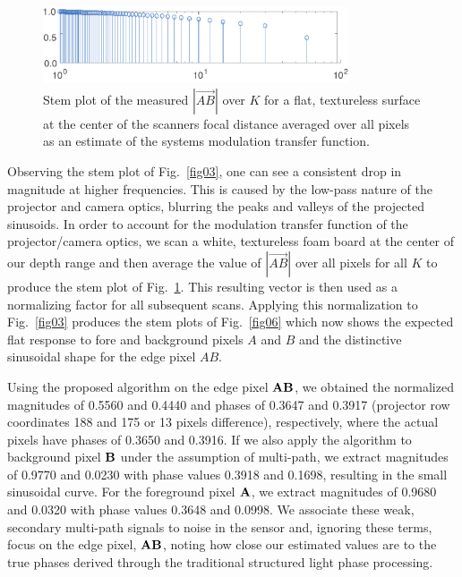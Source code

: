 \documentclass[10pt]{article}
\begin{document}
\begin{figure}[!b]
\centering\includegraphics[width=3.55in]{Figures/figure04}
\caption{Stem plot of the measured $|\vec{AB}|$ over $K$ for a flat, textureless surface at the center of the scanners focal distance averaged over all pixels as an estimate of the systems modulation transfer function.}
\label{fig04}
\end{figure}

Observing the stem plot of Fig.~\ref{fig03}, one can see a consistent drop in magnitude at higher frequencies.  This is caused by the low-pass nature of the projector and camera optics, blurring the peaks and valleys of the projected sinusoids.  In order to account for the modulation transfer function of the projector/camera optics, we scan a white, textureless foam board at the center of our depth range and then average the value of $|\vec{AB}|$ over all pixels for all $K$ to produce the stem plot of Fig.~\ref{fig04}.  This resulting vector is then used as a normalizing factor for all subsequent scans. Applying this normalization to Fig.~\ref{fig03} produces the stem plots of Fig.~\ref{fig06} which now shows the expected flat response to fore and background pixels $A$ and $B$ and the distinctive sinusoidal shape for the edge pixel $AB$. 

Using the proposed algorithm on the edge pixel ${\bf AB}$, we obtained the normalized magnitudes of 0.5560 and 0.4440 and phases of 0.3647 and 0.3917 (projector row coordinates 188 and 175 or 13 pixels difference), respectively, where the actual pixels have phases of 0.3650 and 0.3916.  If we also apply the algorithm to background pixel ${\bf B}$ under the assumption of multi-path, we extract magnitudes of 0.9770 and 0.0230 with phase values 0.3918 and 0.1698, resulting in the small sinusoidal curve.  For the foreground pixel ${\bf A}$, we extract magnitudes of 0.9680 and 0.0320 with phase values 0.3648 and 0.0998.  We associate these weak, secondary multi-path signals to noise in the sensor and, ignoring these terms, focus on the edge pixel, ${\bf AB}$, noting how close our estimated values are to the true phases derived through the traditional structured light phase processing.
\end{document}
